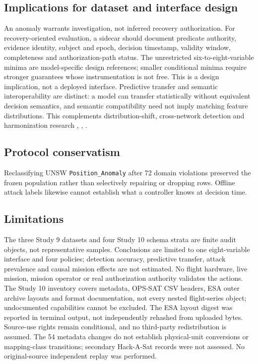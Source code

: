 \documentclass[preprint,12pt]{elsarticle}
\begin{document}
\subsection{Implications for dataset and interface design}
An anomaly warrants investigation, not inferred recovery authorization. For recovery-oriented evaluation, a sidecar should document predicate authority, evidence identity, subject and epoch, decision timestamp, validity window, completeness and authorization-path status. The unrestricted six-to-eight-variable minima are model-specific design references; smaller conditional minima require stronger guarantees whose instrumentation is not free. This is a design implication, not a deployed interface. Predictive transfer and semantic interoperability are distinct: a model can transfer statistically without equivalent decision semantics, and semantic compatibility need not imply matching feature distributions. This complements distribution-shift, cross-network detection and harmonization research \cite{koh2021wilds}, \cite{cerasuolo2026transfer}, \cite{rodriguez2026harmonization}.

\subsection{Protocol conservatism}
Reclassifying UNSW \texttt{Position\_Anomaly} after 72 domain violations preserved the frozen population rather than selectively repairing or dropping rows. Offline attack labels likewise cannot establish what a controller knows at decision time.

\subsection{Limitations}
The three Study 9 datasets and four Study 10 schema strata are finite audit objects, not representative samples. Conclusions are limited to one eight-variable interface and four policies; detection accuracy, predictive transfer, attack prevalence and causal mission effects are not estimated. No flight hardware, live mission, mission operator or real authorization authority validates the actions. The Study 10 inventory covers metadata, OPS-SAT CSV headers, ESA outer archive layouts and format documentation, not every nested flight-series object; undocumented capabilities cannot be excluded. The ESA layout digest was reported in terminal output, not independently rehashed from uploaded bytes. Source-use rights remain conditional, and no third-party redistribution is assumed. The 54 metadata changes do not establish physical-unit conversions or mapping-class transitions; secondary Hack-A-Sat records were not assessed. No original-source independent replay was performed.
\end{document}

